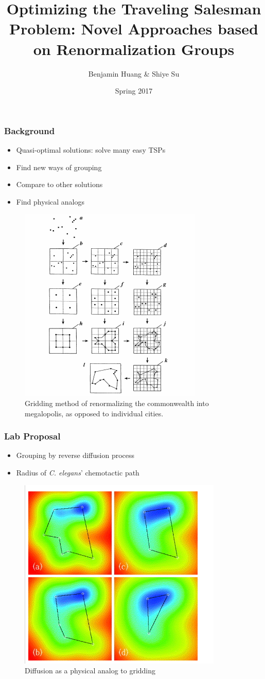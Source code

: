 \documentclass{beamer}
\title{\textbf{Optimizing the Traveling Salesman Problem: Novel Approaches based on Renormalization Groups}}
\author{Benjamin Huang \& Shiye Su}
\institute{ISC 233/234}
\date{Spring 2017}
\begin{document}
 
\frame{\titlepage}
 
\begin{frame}
\frametitle{Background}
\begin{itemize}
\item Quasi-optimal solutions: solve many easy TSPs
\item Find new ways of grouping
\item Compare to other solutions
\item Find physical analogs
\end{itemize}
\begin{figure}[H]
  \centering
  \includegraphics[width=.4\textwidth]{AlgGroup}
  \caption{Gridding method of renormalizing the commonwealth into megalopolis, as opposed to individual cities. }
  \label{fig:Grid}
\end{figure}
\end{frame}
 
\begin{frame}
  \frametitle{Lab Proposal}
\begin{itemize}
\item Grouping by reverse diffusion process
\item Radius of \textit{C. elegans}' chemotactic path 
\end{itemize}
\begin{figure}[H]
  \centering
  \includegraphics[width=.4\textwidth]{Blob.png}
  \caption{Diffusion as a physical analog to gridding}
\end{figure}
\end{frame}
\end{document}
